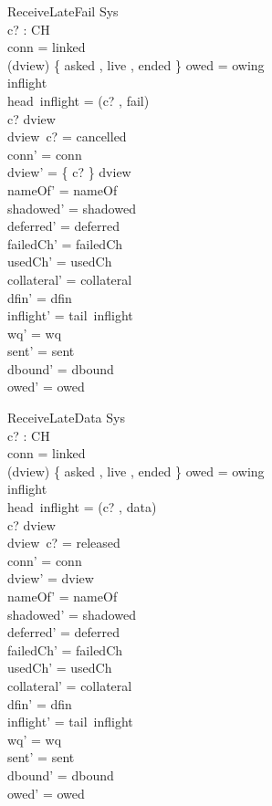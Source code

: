 \documentclass[a4paper,10pt,fleqn]{article}
\begin{document}
\begin{schema}{ReceiveLateFail}
  \Delta Sys \\
  c? : CH \\
\where
  conn = linked \\
  (\ran dview) \cap \{ asked , live , ended \} \neq \emptyset \lor owed = owing \\
  inflight \neq \langle \rangle \\
  head~inflight = (c? , fail) \\
  c? \in \dom dview \\
  dview~c? = cancelled \\
  conn' = conn \\
  dview' = \{ c? \} \ndres dview \\
  nameOf' = nameOf \\
  shadowed' = shadowed \\
  deferred' = deferred \\
  failedCh' = failedCh \\
  usedCh' = usedCh \\
  collateral' = collateral \\
  dfin' = dfin \\
  inflight' = tail~inflight \\
  wq' = wq \\
  sent' = sent \\
  dbound' = dbound \\
  owed' = owed
\end{schema}

\begin{schema}{ReceiveLateData}
  \Delta Sys \\
  c? : CH \\
\where
  conn = linked \\
  (\ran dview) \cap \{ asked , live , ended \} \neq \emptyset \lor owed = owing \\
  inflight \neq \langle \rangle \\
  head~inflight = (c? , data) \\
  c? \in \dom dview \\
  dview~c? = released \\
  conn' = conn \\
  dview' = dview \\
  nameOf' = nameOf \\
  shadowed' = shadowed \\
  deferred' = deferred \\
  failedCh' = failedCh \\
  usedCh' = usedCh \\
  collateral' = collateral \\
  dfin' = dfin \\
  inflight' = tail~inflight \\
  wq' = wq \\
  sent' = sent \\
  dbound' = dbound \\
  owed' = owed
\end{schema}
\end{document}
